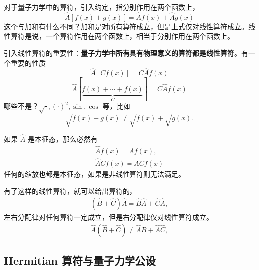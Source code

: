 对于量子力学中的算符，引入约定，指分别作用在两个函数上，
\begin{equation}
    \hat A [f(x) + g(x)] = \hat A f(x) + \hat A g(x)
\end{equation}
这个与加和有什么不同？加和是对所有算符成立，但是上式仅对线性算符成立。线性算符是说，一个算符作用在两个函数上，相当于分别作用在两个函数上。

引入线性算符的重要性：\textbf{量子力学中所有具有物理意义的算符都是线性算符}。有一个重要的性质
\begin{equation}
    \hat A [C f(x)] = C\hat A f(x)
\end{equation}
\begin{equation}
    \hat A[ \underbrace{f(x) + \cdots + f(x)}_{C} ] = C\hat A f(x)
\end{equation}
哪些不是？$\sqrt{\cdot}, (\cdot)^2, \sin, \cos$ 等，比如
\begin{equation}
    \sqrt{f(x) + g(x)} \neq \sqrt{f(x)} + \sqrt{g(x)}. 
\end{equation}


如果 $\hat A$ 是本征态，那么必然有
\begin{eqnarray}
    \hat A f(x) = A f(x), \\
    \hat A C f(x) = AC f(x)
\end{eqnarray}
任何的缩放也都是本征态，如果是非线性算符则无法满足。

有了这样的线性算符，就可以给出算符的，
\begin{eqnarray}
    (\hat B + \hat C) \hat A = \hat B \hat A + \hat C \hat A,
\end{eqnarray}
左右分配律对任何算符一定成立，但是右分配律仅对线性算符成立。
\begin{eqnarray}
    \hat A (\hat B + \hat C)  \neq \hat A \hat B + \hat A \hat C,
\end{eqnarray}

\subsection{Hermitian 算符与量子力学公设}

